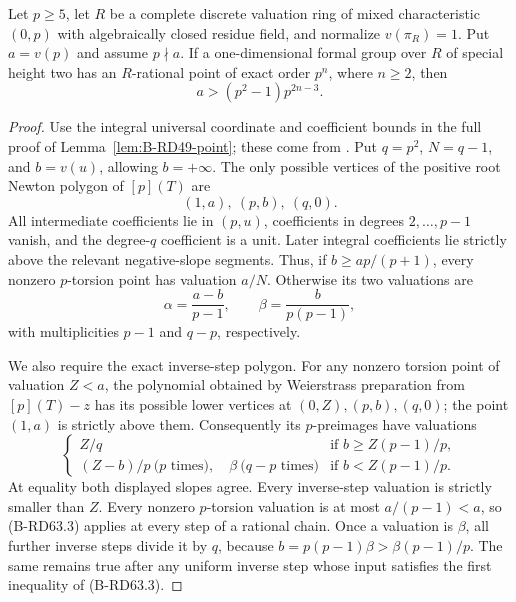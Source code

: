 \begin{lemma}
\label{lem:B-RD63-point}
Let $p\ge5$, let $R$ be a complete discrete valuation ring of mixed
characteristic $(0,p)$ with algebraically closed residue field, and
normalize $v(\pi_R)=1$. Put $a=v(p)$ and assume $p\nmid a$.
If a one-dimensional formal group over $R$ of special height two
has an $R$-rational point of exact order $p^n$, where $n\ge2$, then
\[
                    a>(p^2-1)p^{2n-3}.                 \tag{B-RD63.1}
\]
\end{lemma}
\begin{proof}
Use the integral universal coordinate and coefficient bounds in
the full proof of Lemma~\ref{lem:B-RD49-point}; these come from
\cite[Proposition~5.7; (12.3)--(12.5); Proposition~12.10 and proof]
{HopkinsGross1994Bundles}. Put $q=p^2$, $N=q-1$, and $b=v(u)$,
allowing $b=+\infty$. The only possible vertices of the positive
root Newton polygon of $[p](T)$ are
\[
                         (1,a),\ (p,b),\ (q,0).
\]
All intermediate coefficients lie in $(p,u)$, coefficients in
degrees $2,\ldots,p-1$ vanish, and the degree-$q$ coefficient is a
unit. Later integral coefficients lie strictly above the relevant
negative-slope segments. Thus, if $b\ge ap/(p+1)$, every nonzero
$p$-torsion point has valuation $a/N$. Otherwise its two valuations
are
\[
       \alpha=\frac{a-b}{p-1},\qquad
       \beta=\frac{b}{p(p-1)},                           \tag{B-RD63.2}
\]
with multiplicities $p-1$ and $q-p$, respectively.

We also require the exact inverse-step polygon. For any nonzero
torsion point of valuation $Z<a$, the polynomial obtained by
Weierstrass preparation from $[p](T)-z$ has its possible lower
vertices at $(0,Z),(p,b),(q,0)$; the point $(1,a)$ is strictly
above them. Consequently its $p$-preimages have valuations
\[
 \begin{cases}
 Z/q &\text{if } b\ge Z(p-1)/p,\\
 (Z-b)/p\ \text{($p$ times)},\quad
 \beta\ \text{($q-p$ times)}&\text{if }b<Z(p-1)/p.
 \end{cases}                                           \tag{B-RD63.3}
\]
At equality both displayed slopes agree. Every inverse-step
valuation is strictly smaller than $Z$. Every nonzero $p$-torsion
valuation is at most $a/(p-1)<a$, so (B-RD63.3) applies at every
step of a rational chain. Once a valuation is $\beta$, all further
inverse steps divide it by $q$, because
$b=p(p-1)\beta>\beta(p-1)/p$. The same remains true after any
uniform inverse step whose input satisfies the first inequality
of (B-RD63.3).


\end{proof}
